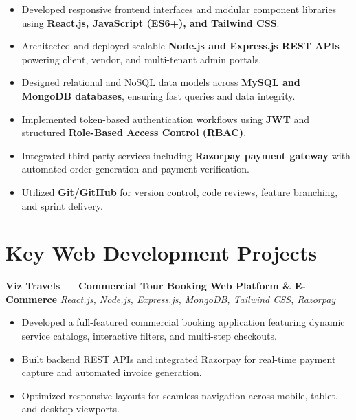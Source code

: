 \documentclass[a4paper,10pt]{article}
\begin{document}
\begin{itemize}

    \item Developed responsive frontend interfaces and modular component libraries using \textbf{React.js, JavaScript (ES6+), and Tailwind CSS}.

    \item Architected and deployed scalable \textbf{Node.js and Express.js REST APIs} powering client, vendor, and multi-tenant admin portals.

    \item Designed relational and NoSQL data models across \textbf{MySQL and MongoDB databases}, ensuring fast queries and data integrity.

    \item Implemented token-based authentication workflows using \textbf{JWT} and structured \textbf{Role-Based Access Control (RBAC)}.

    \item Integrated third-party services including \textbf{Razorpay payment gateway} with automated order generation and payment verification.

    \item Utilized \textbf{Git/GitHub} for version control, code reviews, feature branching, and sprint delivery.

\end{itemize}

\section*{Key Web Development Projects}

\textbf{Viz Travels --- Commercial Tour Booking Web Platform & E-Commerce}
\hfill
\textit{React.js, Node.js, Express.js, MongoDB, Tailwind CSS, Razorpay}

\begin{itemize}

    \item Developed a full-featured commercial booking application featuring dynamic service catalogs, interactive filters, and multi-step checkouts.

    \item Built backend REST APIs and integrated Razorpay for real-time payment capture and automated invoice generation.

    \item Optimized responsive layouts for seamless navigation across mobile, tablet, and desktop viewports.

\end{itemize}
\end{document}
